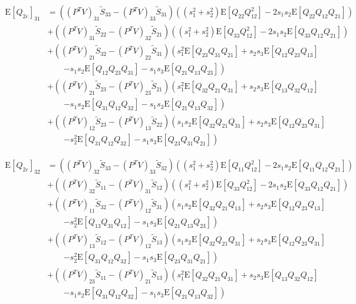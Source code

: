 \documentclass[10pt]{article}
\newcommand{\expect}[1]{\ensuremath{\mathrm{E}\left[ #1 \right]}}
\begin{document}
\begin{align}
	\expect{Q_{2e}}_{31} &= \left( (P^TV)_{31}\tilde{S}_{33} - (P^TV)_{33}\tilde{S}_{31} \right)\left( (s_1^2+s_2^2)\expect{Q_{22}Q_{12}^2} - 2s_1s_2\expect{Q_{22}Q_{12}Q_{21}} \right) \nonumber \\
	&+ \left( (P^TV)_{31}\tilde{S}_{22} - (P^TV)_{32}\tilde{S}_{21} \right)\left( (s_1^2+s_2^2)\expect{Q_{33}Q_{12}^2} - 2s_1s_2\expect{Q_{33}Q_{12}Q_{21}} \right) \nonumber \\
	&+ \left( (P^TV)_{21}\tilde{S}_{32} - (P^TV)_{22}\tilde{S}_{31} \right)\left( s_1^2\expect{Q_{23}Q_{31}Q_{21}} + s_2s_3\expect{Q_{12}Q_{23}Q_{13}} \right. \nonumber \\ &\qquad \left. - s_1s_2\expect{Q_{12}Q_{23}Q_{31}} - s_1s_3\expect{Q_{21}Q_{13}Q_{23}} \right) \nonumber \\
	&+ \left( (P^TV)_{21}\tilde{S}_{23} - (P^TV)_{23}\tilde{S}_{21} \right)\left( s_1^2\expect{Q_{32}Q_{21}Q_{31}} + s_2s_3\expect{Q_{13}Q_{32}Q_{12}} \right. \nonumber \\ &\qquad \left. - s_1s_2\expect{Q_{31}Q_{12}Q_{32}} - s_1s_3\expect{Q_{21}Q_{13}Q_{32}} \right) \nonumber \\
	&+ \left( (P^TV)_{12}\tilde{S}_{23} - (P^TV)_{13}\tilde{S}_{22} \right)\left( s_1s_2\expect{Q_{32}Q_{21}Q_{31}} + s_2s_3\expect{Q_{12}Q_{23}Q_{31}} \right. \nonumber \\ &\qquad \left. - s_2^2\expect{Q_{31}Q_{12}Q_{32}} - s_1s_3\expect{Q_{23}Q_{31}Q_{21}} \right)
\end{align}

\begin{align}
	\expect{Q_{2e}}_{32} &= \left( (P^TV)_{32}\tilde{S}_{33} - (P^TV)_{33}\tilde{S}_{32} \right)\left( (s_1^2+s_2^2)\expect{Q_{11}Q_{12}^2} - 2s_1s_2\expect{Q_{11}Q_{12}Q_{21}} \right) \nonumber \\
	&+ \left( (P^TV)_{32}\tilde{S}_{11} - (P^TV)_{31}\tilde{S}_{12} \right)\left( (s_1^2+s_2^2)\expect{Q_{33}Q_{12}^2} - 2s_1s_2\expect{Q_{33}Q_{12}Q_{21}} \right) \nonumber \\
	&+ \left( (P^TV)_{11}\tilde{S}_{32} - (P^TV)_{12}\tilde{S}_{31} \right)\left( s_1s_2\expect{Q_{32}Q_{21}Q_{13}} + s_2s_3\expect{Q_{12}Q_{23}Q_{13}} \right. \nonumber \\ &\qquad \left. - s_2^2\expect{Q_{13}Q_{31}Q_{12}} - s_1s_3\expect{Q_{21}Q_{13}Q_{23}} \right) \nonumber \\
	&+ \left( (P^TV)_{13}\tilde{S}_{12} - (P^TV)_{12}\tilde{S}_{13} \right)\left( s_1s_2\expect{Q_{32}Q_{21}Q_{31}} + s_2s_3\expect{Q_{12}Q_{23}Q_{31}} \right. \nonumber \\ &\qquad \left. - s_2^2\expect{Q_{31}Q_{12}Q_{32}} - s_1s_3\expect{Q_{23}Q_{31}Q_{21}} \right) \nonumber \\
	&+ \left( (P^TV)_{23}\tilde{S}_{11} - (P^TV)_{21}\tilde{S}_{13} \right)\left( s_1^2\expect{Q_{32}Q_{21}Q_{31}} + s_2s_3\expect{Q_{13}Q_{32}Q_{12}} \right. \nonumber \\ &\qquad \left. - s_1s_2\expect{Q_{31}Q_{12}Q_{32}} - s_1s_3\expect{Q_{21}Q_{13}Q_{32}} \right)
\end{align}
\end{document}
